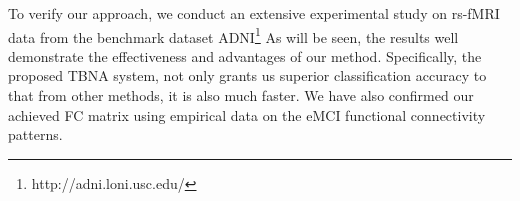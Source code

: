 \documentclass[journal]{IEEEtran}
\begin{document}
	
	
	
	
	To verify our approach, we conduct an extensive experimental study on rs-fMRI data from the
	benchmark dataset ADNI\footnote{http://adni.loni.usc.edu/} As will be seen, the results well demonstrate the effectiveness and advantages of our method. Specifically, the proposed TBNA system, not only grants us superior classification accuracy to that from other methods, it is also much faster. We have also confirmed our achieved FC matrix using empirical data on the eMCI functional connectivity patterns.
	
	
	
	
	
	
	
\end{document}
